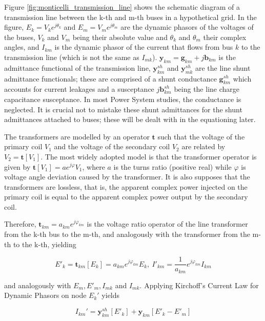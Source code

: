 	Figure \ref{fig:monticelli_transmission_line} shows the schematic diagram of a transmission line between the k-th and m-th buses in a hypothetical grid. In the figure, $E_k = V_ke^{j\theta_k}$ and $E_m = V_me^{j\theta_m}$ are the dynamic phasors of the voltages of the buses, $V_k$ and $V_m$ being their absolute value and $\theta_k$ and $\theta_m$ their complex angles, and $I_{km}$ is the dynamic phasor of the current that flows from bus $k$ to the transmission line (which is not the same as $I_{mk}$). $\mathbf{y}_{km} = \mathbf{g}_{km} + j\mathbf{b}_{km}$ is the admittance functional of the transmission line, $\mathbf{y}^{sh}_{km}$ and $\mathbf{y}^{sh}_{mk}$ are the line shunt admittance functionals; these are comprised of a shunt conductance $\mathbf{g}^{sh}_{km}$ which accounts for current leakages and a susceptance $j\mathbf{b}^{sh}_{km}$ being the line charge capacitance susceptance. In most Power System studies, the conductance is neglected. It is crucial not to mistake these shunt admittances for the shunt admittances attached to buses; these will be dealt with in the equationing later.

	The transformers are modelled by an operator $\mathbf{t}$ such that the voltage of the primary coil $V_1$ and the voltage of the secondary coil $V_2$ are related by $V_2 = \mathbf{t}\left[V_1\right]$. The most widely adopted model is that the transformer operator is given by $\mathbf{t} \left[V_1\right] = a e^{j\varphi}V_1$, where $a$ is the turns ratio (positive real) while $\varphi$ is voltage angle deviation caused by the transformer. It is also supposes that the transformers are lossless, that is, the apparent complex power injected on the primary coil is equal to the apparent complex power output by the secondary coil.

	Therefore, $\mathbf{t}_{km} = a_{km}e^{j\varphi_{km}}$ is the voltage ratio operator of the line transformer from the k-th bus to the m-th, and analogously with the transformer from the m-th to the k-th, yielding

\begin{equation} E'_k = \mathbf{t}_{km}\left[E_k\right] = a_{km}e^{j\varphi_{km}} E_k,\ I'_{km} = \dfrac{1}{a_{km}}e^{j\varphi_{km}} I_{km} \end{equation} 

	\noindent and analogously with $E_m,E'_m,I_{mk}$ and $I_{mk}$. Applying Kirchoff's Current Law for Dynamic Phasors on node $E_k'$ yields

\begin{equation} I_{km}' = \mathbf{y}_{km}^{sh}\left[E'_k\right] + \mathbf{y}_{km}\left[E'_k - E'_m\right] \end{equation}


